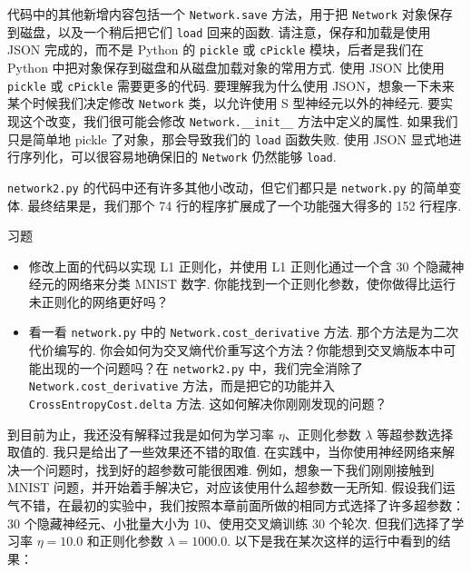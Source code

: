 代码中的其他新增内容包括一个 \texttt{Network.save} 方法，用于把 \texttt{Network} 对象保存到磁盘，以及一个稍后把它们 \texttt{load} 回来的函数. 请注意，保存和加载是使用 JSON 完成的，而不是 Python 的 \texttt{pickle} 或 \texttt{cPickle} 模块，后者是我们在 Python 中把对象保存到磁盘和从磁盘加载对象的常用方式. 使用 JSON 比使用 \texttt{pickle} 或 \texttt{cPickle} 需要更多的代码. 要理解我为什么使用 JSON，想象一下未来某个时候我们决定修改 \texttt{Network} 类，以允许使用 S 型神经元以外的神经元. 要实现这个改变，我们很可能会修改 \texttt{Network.\_\allowbreak{}\_\allowbreak{}init\_\allowbreak{}\_\allowbreak{}} 方法中定义的属性. 如果我们只是简单地 pickle 了对象，那会导致我们的 \texttt{load} 函数失败. 使用 JSON 显式地进行序列化，可以很容易地确保旧的 \texttt{Network} 仍然能够 \texttt{load}.

\texttt{network2.py} 的代码中还有许多其他小改动，但它们都只是 \texttt{network.py} 的简单变体. 最终结果是，我们那个 74 行的程序扩展成了一个功能强大得多的 152 行程序.

\begin{exerciseBox}{习题}

\begin{itemize}

\item 修改上面的代码以实现 L1 正则化，并使用 L1 正则化通过一个含 $30$ 个隐藏神经元的网络来分类 MNIST 数字. 你能找到一个正则化参数，使你做得比运行未正则化的网络更好吗？

\item 看一看 \texttt{network.py} 中的 \texttt{Network.cost\_\allowbreak{}derivative} 方法. 那个方法是为二次代价编写的. 你会如何为交叉熵代价重写这个方法？你能想到交叉熵版本中可能出现的一个问题吗？在 \texttt{network2.py} 中，我们完全消除了 \texttt{Network.cost\_\allowbreak{}derivative} 方法，而是把它的功能并入 \texttt{CrossEntropyCost.delta} 方法. 这如何解决你刚刚发现的问题？

\end{itemize}

\end{exerciseBox}

到目前为止，我还没有解释过我是如何为学习率 $\eta$、正则化参数 $\lambda$ 等超参数选择取值的. 我只是给出了一些效果还不错的取值. 在实践中，当你使用神经网络来解决一个问题时，找到好的超参数可能很困难. 例如，想象一下我们刚刚接触到 MNIST 问题，并开始着手解决它，对应该使用什么超参数一无所知. 假设我们运气不错，在最初的实验中，我们按照本章前面所做的相同方式选择了许多超参数：30 个隐藏神经元、小批量大小为 10、使用交叉熵训练 30 个轮次. 但我们选择了学习率 $\eta = 10.0$ 和正则化参数 $\lambda = 1000.0$. 以下是我在某次这样的运行中看到的结果：

